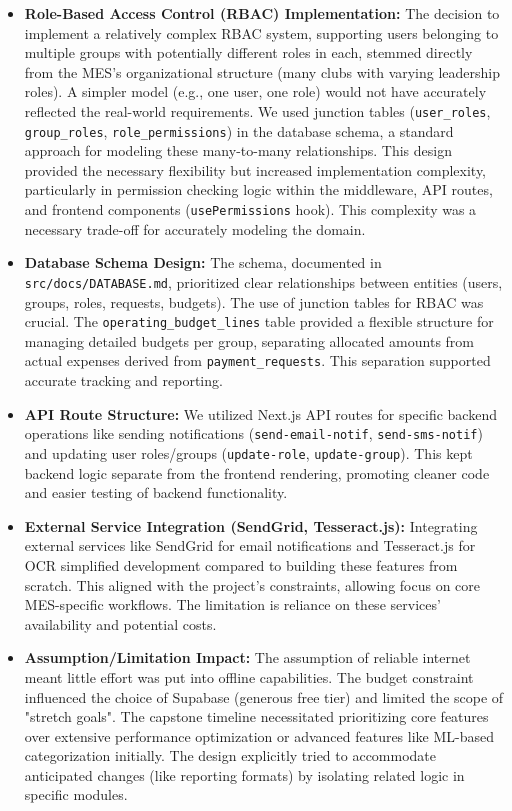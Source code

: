 \documentclass{article}
\begin{document}
\begin{itemize}
    \item \textbf{Role-Based Access Control (RBAC) Implementation:}
        The decision to implement a relatively complex RBAC system, supporting users belonging to multiple groups with potentially different roles in each, stemmed directly from the MES's organizational structure (many clubs with varying leadership roles). A simpler model (e.g., one user, one role) would not have accurately reflected the real-world requirements. We used junction tables (\texttt{user\_roles}, \texttt{group\_roles}, \texttt{role\_permissions}) in the database schema, a standard approach for modeling these many-to-many relationships. This design provided the necessary flexibility but increased implementation complexity, particularly in permission checking logic within the middleware, API routes, and frontend components (\texttt{usePermissions} hook). This complexity was a necessary trade-off for accurately modeling the domain.

    \item \textbf{Database Schema Design:}
        The schema, documented in \texttt{src/docs/DATABASE.md}, prioritized clear relationships between entities (users, groups, roles, requests, budgets). The use of junction tables for RBAC was crucial. The \texttt{operating\_budget\_lines} table provided a flexible structure for managing detailed budgets per group, separating allocated amounts from actual expenses derived from \texttt{payment\_requests}. This separation supported accurate tracking and reporting.

    \item \textbf{API Route Structure:}
        We utilized Next.js API routes for specific backend operations like sending notifications (\texttt{send-email-notif}, \texttt{send-sms-notif}) and updating user roles/groups (\texttt{update-role}, \texttt{update-group}). This kept backend logic separate from the frontend rendering, promoting cleaner code and easier testing of backend functionality.

    \item \textbf{External Service Integration (SendGrid, Tesseract.js):}
        Integrating external services like SendGrid for email notifications and Tesseract.js for OCR simplified development compared to building these features from scratch. This aligned with the project's constraints, allowing focus on core MES-specific workflows. The limitation is reliance on these services' availability and potential costs.

    \item \textbf{Assumption/Limitation Impact:}
        The assumption of reliable internet meant little effort was put into offline capabilities. The budget constraint influenced the choice of Supabase (generous free tier) and limited the scope of "stretch goals". The capstone timeline necessitated prioritizing core features over extensive performance optimization or advanced features like ML-based categorization initially. The design explicitly tried to accommodate anticipated changes (like reporting formats) by isolating related logic in specific modules.
\end{itemize}
\end{document}
